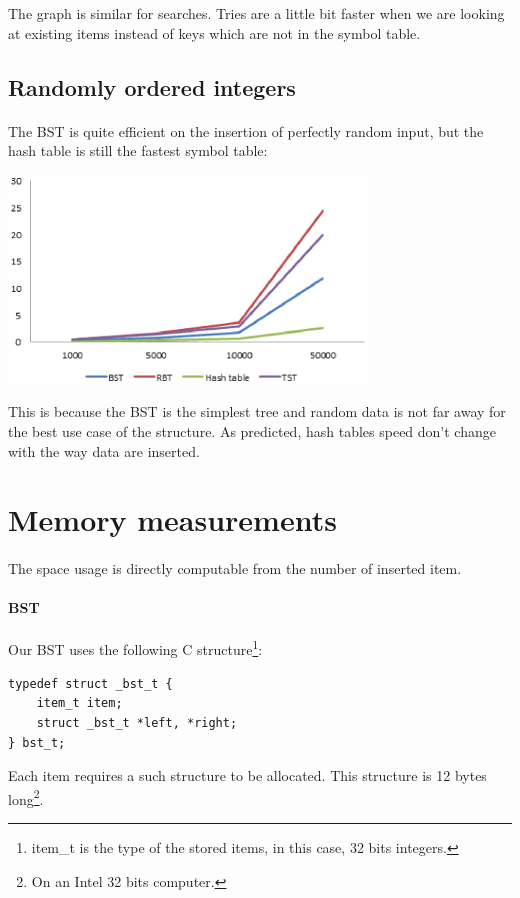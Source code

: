 \documentclass[a4paper]{article}
\begin{document}
The graph is similar for searches. Tries are a little bit faster when we are 
looking at existing items instead of keys which are not in the symbol table.

\subsection{Randomly ordered integers}

    \paragraph{} The BST is quite efficient on the insertion of perfectly 
random input, but the hash table is still the fastest symbol table:

    \begin{center}
        \includegraphics[width=270pt]{insertions_random.eps}
    \end{center}

This is because the BST is the simplest tree and random data is not far away
for the best use case of the structure. As predicted, hash tables speed don't
change with the way data are inserted.

\section{Memory measurements}

    \paragraph{} The space usage is directly computable from the number of 
inserted item.

    \paragraph{BST} Our BST uses the following C structure\footnote{item\_t is
the type of the stored items, in this case, 32 bits integers.}:
\begin{lstlisting}
typedef struct _bst_t {
    item_t item;
    struct _bst_t *left, *right;
} bst_t;
\end{lstlisting}
Each item requires a such structure to be allocated. This structure is 12 bytes
long\footnote{On an Intel 32 bits computer.}.
\end{document}
